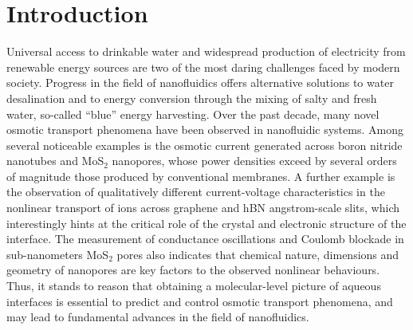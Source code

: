 \documentclass[journal=ancac3,manuscript=article,layout=twocolumn]{achemso}
\begin{document}
\section{Introduction}
Universal access to drinkable water and
 widespread production of electricity
from renewable energy sources are two
of the most daring challenges faced by
modern society. Progress in the field of nanofluidics
offers alternative solutions to
water desalination and to energy conversion
through the mixing of salty and fresh water,
so-called ``blue'' energy harvesting.
Over the past decade, many novel osmotic
transport phenomena have been observed
in nanofluidic
systems.\cite{siria2017new,wang2017fundamental,Tong2021,macha20192d}
Among several noticeable examples is the osmotic
current generated across boron nitride nanotubes
and MoS$_2$ nanopores,
whose power densities exceed by several orders of magnitude
those produced by conventional
membranes\cite{Siria2013,feng2016single}.
A further example is the observation of qualitatively
different current-voltage characteristics
in the nonlinear transport of ions across graphene
and hBN angstrom-scale
slits, which interestingly hints at the critical role
of the crystal and electronic structure of the interface\cite{esfandiar2017size}.
The measurement of conductance oscillations and
Coulomb blockade in sub-nanometers MoS$_2$ pores
also indicates that  chemical nature,
 dimensions and geometry  of nanopores
are key factors to the observed nonlinear behaviours\cite{feng2016observation}.
Thus, it stands to reason that
obtaining a molecular-level picture of
aqueous interfaces is essential to predict and control
osmotic transport phenomena, and may lead to
fundamental advances in the field of nanofluidics.
\end{document}
